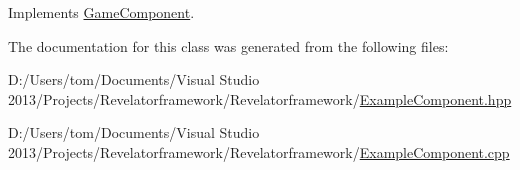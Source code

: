 Implements \hyperlink{class_game_component_af4ff61bad044ac587cf2f066d5b4afa0}{Game\-Component}.



The documentation for this class was generated from the following files\-:\begin{DoxyCompactItemize}
\item 
D\-:/\-Users/tom/\-Documents/\-Visual Studio 2013/\-Projects/\-Revelatorframework/\-Revelatorframework/\hyperlink{_example_component_8hpp}{Example\-Component.\-hpp}\item 
D\-:/\-Users/tom/\-Documents/\-Visual Studio 2013/\-Projects/\-Revelatorframework/\-Revelatorframework/\hyperlink{_example_component_8cpp}{Example\-Component.\-cpp}\end{DoxyCompactItemize}
